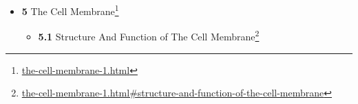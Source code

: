 \documentclass[
]{article}
\providecommand{\tightlist}{%
  \setlength{\itemsep}{0pt}\setlength{\parskip}{0pt}}
\providecommand{\tightlist}{%
  \setlength{\itemsep}{0pt}\setlength{\parskip}{0pt}}
\let\rmarkdownfootnote\footnote%
\def\footnote{\protect\rmarkdownfootnote}
\renewcommand{\href}[2]{#2\footnote{\url{#1}}}
\theoremstyle{definition}
\theoremstyle{definition}
\theoremstyle{definition}
\theoremstyle{remark}
\begin{document}
\begin{itemize}
\begin{itemize}
    \begin{itemize}
    \tightlist
    \item
      \href{the-cell.html\#the-cell-nucleus}{\emph{}\textbf{4.6.1} The
      Cell Nucleus}
    \item
      \href{the-cell.html\#the-mitochondria}{\emph{}\textbf{4.6.2} The
      Mitochondria}
    \item
      \href{the-cell.html\#the-chloroplasts}{\emph{}\textbf{4.6.3} The
      Chloroplasts}
    \item
      \href{the-cell.html\#the-endoplasmic-reticulum}{\emph{}\textbf{4.6.4}
      The Endoplasmic Reticulum}
    \item
      \href{the-cell.html\#the-golgi-apparatus}{\emph{}\textbf{4.6.5}
      The Golgi Apparatus}
    \item
      \href{the-cell.html\#the-ribosomes}{\emph{}\textbf{4.6.6} The
      Ribosomes}
    \end{itemize}
  \item
    \href{the-cell.html\#structures-outside-the-cell-membrane}{\emph{}\textbf{4.7}
    Structures Outside The Cell Membrane}
  \item
    \href{the-cell.html\#cellular-replication}{\emph{}\textbf{4.8}
    Cellular Replication}
  \item
    \href{the-cell.html\#dna-repair}{\emph{}\textbf{4.9} DNA Repair}
  \item
    \href{the-cell.html\#cellular-growth-and-metabolism}{\emph{}\textbf{4.10}
    Cellular Growth And Metabolism}
  \item
    \href{the-cell.html\#protein-synthesis}{\emph{}\textbf{4.11} Protein
    Synthesis}
  \item
    \href{the-cell.html\#cell-motility}{\emph{}\textbf{4.12} Cell
    Motility}
  \item
    \href{the-cell.html\#origin-of-the-first-cell}{\emph{}\textbf{4.13}
    Origin of The First Cell}
  \item
    \href{the-cell.html\#origin-of-eukaryotic-cells}{\emph{}\textbf{4.14}
    Origin of Eukaryotic Cells}
  \end{itemize}
\item
  \href{the-cell-membrane-1.html}{\emph{}\textbf{5} The Cell Membrane}

  \begin{itemize}
  \tightlist
  \item
    \href{the-cell-membrane-1.html\#structure-and-function-of-the-cell-membrane}{\emph{}\textbf{5.1}
    Structure And Function of The Cell Membrane}


\end{itemize}
\end{itemize}
\end{document}
